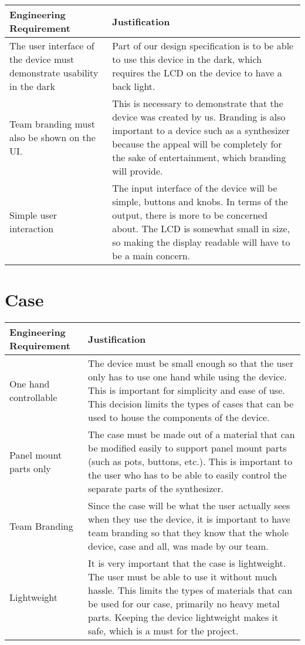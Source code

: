 \documentclass{article}
\begin{document}
\begin{tabular}{|p{3in}|p{3in}|}
\hline
Engineering Requirement & Justification \\
\hline
The user interface of the device must demonstrate usability in the dark&
Part of our design specification is to be able to use this device in the dark, which requires the LCD on the device to have a back light.\\
\hline
Team branding must also be shown on the UI. &
This is necessary to demonstrate that the device was created by us.
Branding is also important to a device such as a synthesizer because the appeal will be completely for the sake of entertainment, which branding will provide.\\
\hline
Simple user interaction& 
The input interface of the device will be simple, buttons and knobs.
In terms of the output, there is more to be concerned about. 
The LCD is somewhat small in size, so making the display readable will have to be a main concern.\\
\hline
\end{tabular}

\section{Case}

\begin{tabular}{|p{3in}|p{3in}|}
\hline
Engineering Requirement & Justification \\
\hline
One hand controllable&
The device must be small enough so that the user only has to use one hand while using the device.
This is important for simplicity and ease of use. This decision limits the types of cases that can be used to house the components of the device.\\
\hline
Panel mount parts only&
The case must be made out of a material that can be modified easily to support panel mount parts (such as pots, buttons, etc.).
This is important to the user who has to be able to easily control the separate parts of the synthesizer.\\
\hline
Team Branding&
Since the case will be what the user actually sees when they use the device, it is important to have team branding so that they know that the whole device,
case and all, was made by our team.\\
\hline
Lightweight&
It is very important that the case is lightweight. The user must be able to use it without much hassle. 
This limits the types of materials that can be used for our case, primarily no heavy metal parts.
Keeping the device lightweight makes it safe, which is a must for the project.\\
\hline
\end{tabular}
\end{document}
